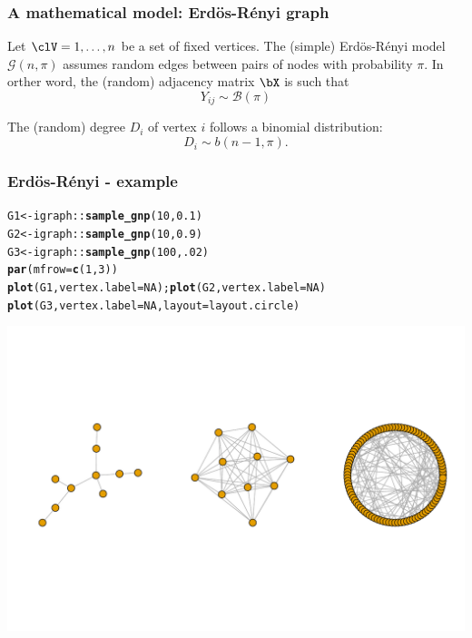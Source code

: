 \documentclass{beamer}\usepackage[]{graphicx}\usepackage[]{color}
\makeatletter
\newcommand{\hlnum}[1]{\textcolor[rgb]{0.686,0.059,0.569}{#1}}%
\newcommand{\hlopt}[1]{\textcolor[rgb]{0,0,0}{#1}}%
\newcommand{\hlstd}[1]{\textcolor[rgb]{0.345,0.345,0.345}{#1}}%
\newcommand{\hlkwb}[1]{\textcolor[rgb]{0.69,0.353,0.396}{#1}}%
\newcommand{\hlkwc}[1]{\textcolor[rgb]{0.333,0.667,0.333}{#1}}%
\newcommand{\hlkwd}[1]{\textcolor[rgb]{0.737,0.353,0.396}{\textbf{#1}}}%
\newenvironment{kframe}{%
 \def\at@end@of@kframe{}%
 \ifinner\ifhmode%
  \def\at@end@of@kframe{\end{minipage}}%
  \begin{minipage}{\columnwidth}%
 \fi\fi%
 \def\FrameCommand##1{\hskip\@totalleftmargin \hskip-\fboxsep
 \colorbox{shadecolor}{##1}\hskip-\fboxsep
     \hskip-\linewidth \hskip-\@totalleftmargin \hskip\columnwidth}%
 \MakeFramed {\advance\hsize-\width
   \@totalleftmargin\z@ \linewidth\hsize
   \@setminipage}}%
 {\par\unskip\endMakeFramed%
 \at@end@of@kframe}
\newenvironment{knitrout}{}{} %
\makeatother
\begin{document}
\begin{frame}
  \frametitle{A mathematical model: Erdös-Rényi graph}

  \begin{definition}
    Let $\clV = {1,\dots,n}$ be a set of fixed vertices. The (simple) Erdös-Rényi model $\mathcal{G}(n,\pi)$ assumes random edges between pairs of nodes with probability $\pi$. In orther word, the (random) adjacency matrix $\bX$ is such that
    \begin{equation*}
      Y_{ij} \sim \mathcal{B}(\pi)
    \end{equation*}
  \end{definition}

  \vfill

  \begin{proposition}
    The (random) degree $D_i$ of vertex $i$ follows a binomial distribution:
      \begin{equation*}
        D_i \sim b(n-1, \pi).
      \end{equation*}
  \end{proposition}

\end{frame}

\begin{frame}[fragile]
  \frametitle{Erdös-Rényi - example}

\begin{knitrout}\scriptsize
{}\color{fgcolor}\begin{kframe}
\begin{alltt}
\hlstd{G1} \hlkwb{<-} \hlstd{igraph}\hlopt{::}\hlkwd{sample_gnp}\hlstd{(}\hlnum{10}\hlstd{,} \hlnum{0.1}\hlstd{)}
\hlstd{G2} \hlkwb{<-} \hlstd{igraph}\hlopt{::}\hlkwd{sample_gnp}\hlstd{(}\hlnum{10}\hlstd{,} \hlnum{0.9}\hlstd{)}
\hlstd{G3} \hlkwb{<-} \hlstd{igraph}\hlopt{::}\hlkwd{sample_gnp}\hlstd{(}\hlnum{100}\hlstd{,} \hlnum{.02}\hlstd{)}
\hlkwd{par}\hlstd{(}\hlkwc{mfrow}\hlstd{=}\hlkwd{c}\hlstd{(}\hlnum{1}\hlstd{,}\hlnum{3}\hlstd{))}
\hlkwd{plot}\hlstd{(G1,} \hlkwc{vertex.label}\hlstd{=}\hlnum{NA}\hlstd{) ;} \hlkwd{plot}\hlstd{(G2,} \hlkwc{vertex.label}\hlstd{=}\hlnum{NA}\hlstd{)}
\hlkwd{plot}\hlstd{(G3,} \hlkwc{vertex.label}\hlstd{=}\hlnum{NA}\hlstd{,} \hlkwc{layout}\hlstd{=layout.circle)}
\end{alltt}
\end{kframe}
\includegraphics[width=.8\textwidth]{figures/ER_example-1} 
\end{knitrout}
\end{frame}
\end{document}
